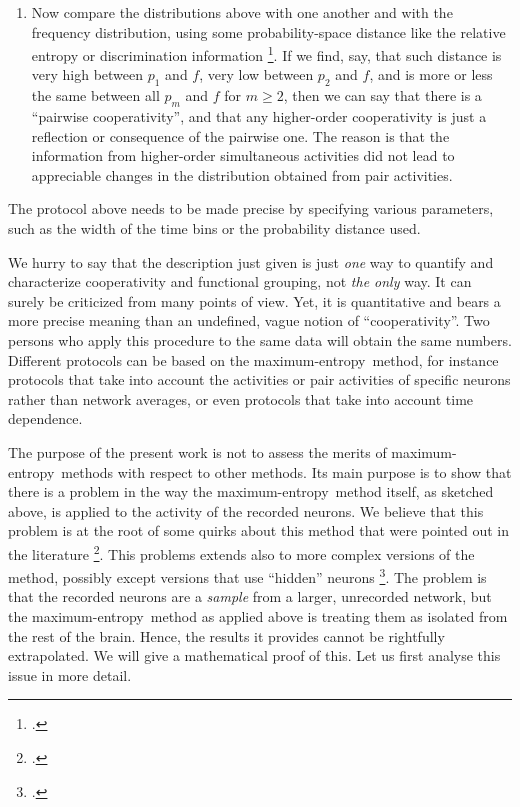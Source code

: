 \documentclass[\ifafour a4paper,12pt,\else a5paper,10pt,\fi%
onecolumn,oneside,article,%
british%
]{memoir}
\theoremstyle{remark}
\theoremstyle{innote}
\newcommand*{\citep}{\footcites}
\renewcommand*{\ge}{\geqslant}%
\renewcommand*{\|}[1][]{\nonscript\,#1\vert\nonscript\;\mathopen{}}
\newcommand*{\yav}{a}
\newcommand*{\ya}{\yav}%
\newcommand*{\me}{maximum-entropy}
\begin{document}
\begin{enumerate}
  We also have the empirical frequency distribution of the total activity,
  $f(\ya)$, counted from the time bins.

\item Now compare the distributions above with one another and with the
  frequency distribution, using some probability-space distance like the
  relative entropy or discrimination information
  \citep{kullback1987,jaynes1963,hobson1969,hobsonetal1973}. If we find,
  say, that such distance is very high between $p_1$ and $f$, very low
  between $p_2$ and $f$, and is more or less the same between all $p_m$ and
  $f$ for $m \ge 2$, then we can say that there is a \enquote{pairwise
    cooperativity}, and that any higher-order cooperativity is just a
  reflection or consequence of the pairwise one. The reason is that the
  information from higher-order simultaneous activities did not lead to
  appreciable changes in the distribution obtained from pair activities.
\end{enumerate}
The protocol above needs to be made precise by specifying various
parameters, such as the width of the time bins or the probability
distance used.

We hurry to say that the description just given is just \emph{one} way to
quantify and characterize cooperativity and functional grouping, not
\emph{the only} way. It can surely be criticized from many points of view.
Yet, it is quantitative and bears a more precise meaning than an undefined,
vague notion of \enquote{cooperativity}. Two persons who apply this
procedure to the same data will obtain the same numbers. Different
protocols can be based on the \me\ method, for instance protocols that take
into account the activities or pair activities of specific neurons rather
than network averages, or even protocols that take into account time
dependence.

The purpose of the present work is not to assess the merits of \me\ methods
with respect to other methods. Its main purpose is to show that there is a
problem in the way the \me\ method itself, as sketched above, is applied to
the activity of the recorded neurons. We believe that this problem is at
the root of some quirks about this method that were pointed out in the
literature \citep{roudietal2009b}. This problems extends also to more
complex versions of the method, possibly except versions that use
\enquote{hidden} neurons
\citep{smolensky1986,kulkarnietal2007,huang2015,dunnetal2017}. The problem is
that the recorded neurons are a \emph{sample} from a larger, unrecorded
network, but the \me\ method as applied above is treating them as
isolated from the rest of the brain. Hence, the results it provides cannot
be rightfully extrapolated. We will give a mathematical proof of this. Let
us first analyse this issue in more detail.
\end{document}
